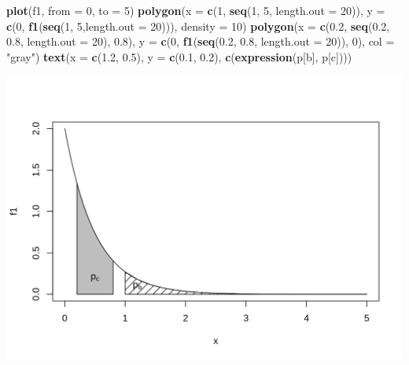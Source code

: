 \documentclass[10pt,a4paper]{book}
\newenvironment{Shaded}{\begin{snugshade}}{\end{snugshade}}
\newcommand{\KeywordTok}[1]{\textcolor[rgb]{0.13,0.29,0.53}{\textbf{#1}}}
\newcommand{\DataTypeTok}[1]{\textcolor[rgb]{0.13,0.29,0.53}{#1}}
\newcommand{\DecValTok}[1]{\textcolor[rgb]{0.00,0.00,0.81}{#1}}
\newcommand{\FloatTok}[1]{\textcolor[rgb]{0.00,0.00,0.81}{#1}}
\newcommand{\StringTok}[1]{\textcolor[rgb]{0.31,0.60,0.02}{#1}}
\newcommand{\NormalTok}[1]{#1}
\begin{document}
\begin{Shaded}
\begin{Highlighting}[]
\KeywordTok{plot}\NormalTok{(f1, }\DataTypeTok{from =} \DecValTok{0}\NormalTok{, }\DataTypeTok{to =} \DecValTok{5}\NormalTok{)}
\KeywordTok{polygon}\NormalTok{(}\DataTypeTok{x =} \KeywordTok{c}\NormalTok{(}\DecValTok{1}\NormalTok{, }\KeywordTok{seq}\NormalTok{(}\DecValTok{1}\NormalTok{, }\DecValTok{5}\NormalTok{, }\DataTypeTok{length.out =} \DecValTok{20}\NormalTok{)),}
        \DataTypeTok{y =} \KeywordTok{c}\NormalTok{(}\DecValTok{0}\NormalTok{, }\KeywordTok{f1}\NormalTok{(}\KeywordTok{seq}\NormalTok{(}\DecValTok{1}\NormalTok{, }\DecValTok{5}\NormalTok{,}\DataTypeTok{length.out =} \DecValTok{20}\NormalTok{))),}
        \DataTypeTok{density =} \DecValTok{10}\NormalTok{)}
\KeywordTok{polygon}\NormalTok{(}\DataTypeTok{x =} \KeywordTok{c}\NormalTok{(}\FloatTok{0.2}\NormalTok{, }\KeywordTok{seq}\NormalTok{(}\FloatTok{0.2}\NormalTok{, }\FloatTok{0.8}\NormalTok{, }\DataTypeTok{length.out =} \DecValTok{20}\NormalTok{), }\FloatTok{0.8}\NormalTok{),}
        \DataTypeTok{y =} \KeywordTok{c}\NormalTok{(}\DecValTok{0}\NormalTok{, }\KeywordTok{f1}\NormalTok{(}\KeywordTok{seq}\NormalTok{(}\FloatTok{0.2}\NormalTok{, }\FloatTok{0.8}\NormalTok{, }\DataTypeTok{length.out =} \DecValTok{20}\NormalTok{)), }\DecValTok{0}\NormalTok{),}
        \DataTypeTok{col =} \StringTok{"gray"}\NormalTok{)}
\KeywordTok{text}\NormalTok{(}\DataTypeTok{x =} \KeywordTok{c}\NormalTok{(}\FloatTok{1.2}\NormalTok{, }\FloatTok{0.5}\NormalTok{), }\DataTypeTok{y =} \KeywordTok{c}\NormalTok{(}\FloatTok{0.1}\NormalTok{, }\FloatTok{0.2}\NormalTok{),}
     \KeywordTok{c}\NormalTok{(}\KeywordTok{expression}\NormalTok{(p[b], p[c])))}
\end{Highlighting}
\end{Shaded}

\begin{center}\includegraphics{figures/unnamed-chunk-328-1} \end{center}
\end{document}
